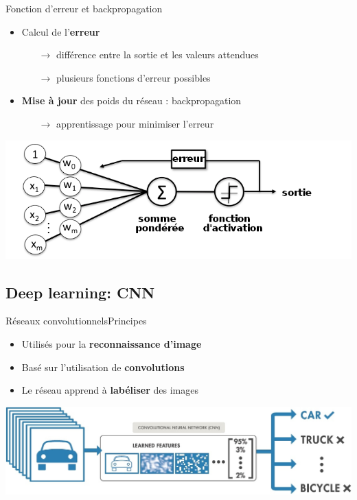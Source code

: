 \documentclass[compress]{beamer}
\begin{document}
\begin{frame}{Fonction d'erreur et backpropagation}
	\begin{itemize}
		\item Calcul de l'\textbf{\color{fibeamer@orange}erreur}
		\begin{itemize}
		  \item[$\rightarrow$] différence entre la sortie et les valeurs attendues
		  \item[$\rightarrow$] plusieurs fonctions d'erreur possibles
		\end{itemize}
		\item \textbf{\color{fibeamer@orange}Mise à jour} des poids du réseau : backpropagation
		\begin{itemize}
			\item[$\rightarrow$] apprentissage pour minimiser l'erreur
					
		\end{itemize}
	\end{itemize}
	\bigskip
	\centering
	\includegraphics[width=1\linewidth]{resources/clem/error}
\end{frame}

\subsection{Deep learning: CNN}
\begin{frame}{Réseaux convolutionnels}{Principes}
	\begin{itemize}
		\item Utilisés pour la \textbf{\color{fibeamer@orange}reconnaissance d'image}
		\item Basé sur l'utilisation de \textbf{\color{fibeamer@orange}convolutions}
		\item Le réseau apprend à \textbf{\color{fibeamer@orange}labéliser} des images
	\end{itemize}
	\bigskip
	\centering
	\includegraphics[width=1\linewidth]{resources/clem/car2}
\end{frame}
\end{document}
